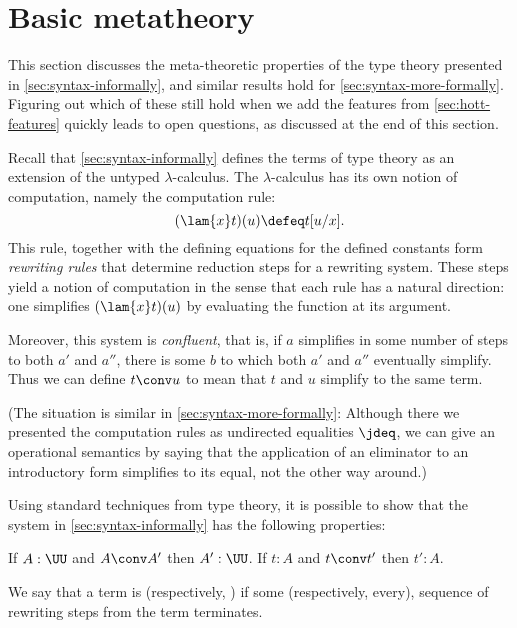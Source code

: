 \section{Basic metatheory}
%

This section discusses the meta-theoretic properties of the type theory presented in 
\cref{sec:syntax-informally}, and similar results hold for \cref{sec:syntax-more-formally}. Figuring out which of these still hold when we add the features from \cref{sec:hott-features} quickly leads to open questions, as discussed at the end of this section.

Recall that \cref{sec:syntax-informally} defines the terms of type theory as
an extension of the untyped $\lambda$-calculus. The $\lambda$-calculus 
has its own notion of computation, namely the computation rule: 
\[
  (\lam{x} t)(u) \defeq t[u/x].
\]
This rule, together with the defining equations for the defined constants form
\emph{rewriting rules} that determine reduction steps for a rewriting 
system. These steps yield a notion of computation in the sense that each rule
has a natural direction: one simplifies $(\lam{x} t)(u)$ by evaluating the
function at its argument.

Moreover, this system is \emph{confluent}, that is, if $a$ simplifies in some
number of steps to both $a'$ and $a''$, there is some $b$ to which both $a'$ and
$a''$ eventually simplify. Thus we can define $t\conv u$ to mean that $t$ and
$u$ simplify to the same term.

(The situation is similar in \cref{sec:syntax-more-formally}: Although there
we presented the computation rules as undirected equalities $\jdeq$, we can give
an operational semantics by saying that the application of an eliminator to an
introductory form simplifies to its equal, not the other way around.)

Using standard techniques from type theory, it is possible to show that the system in \cref{sec:syntax-informally}
has the following properties:

\begin{thm}\label{thm:conversion-preserves-typing}
If $A : \UU$ and $A \conv A'$ then $A' : \UU$.
If $t:A$ and $t \conv t'$ then $t':A$.
\end{thm}

We say that a term is 
%
%
%
(respectively, )
%
%
%
if some (respectively, every), sequence of rewriting steps from the term
terminates.

